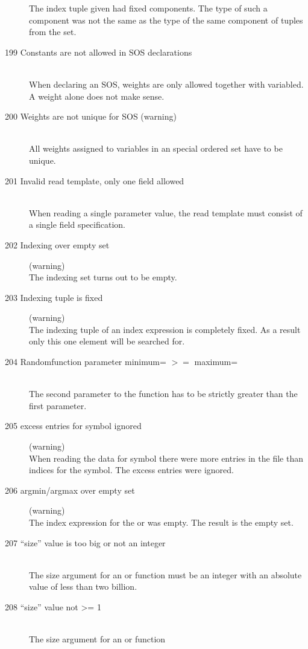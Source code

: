 \begin{description}
  The index tuple given had fixed components. The type of such a
  component was not the same as the type of the same component of tuples
  from the set.
\item[199 Constants are not allowed in SOS declarations]\ \\
  When declaring an SOS, weights are only allowed together with
  variabled. A weight alone does not make sense.
\item[200 Weights are not unique for SOS \code{xxx} (warning)]\ \\
  All weights assigned to variables in an special ordered set have to
  be unique. 
\item[201 Invalid read template, only one field allowed]\ \\
  When reading a single parameter value, the read template must
  consist of a single field specification.
\item[202 Indexing over empty set] (warning)\ \\
  The indexing set turns out to be empty.
\item[203 Indexing tuple is fixed] (warning)\ \\
  The indexing tuple of an index expression is completely fixed. As a
  result only this one element will be searched for.
\item[204 Randomfunction parameter minimum= \code{xxx} $>=$ maximum=
  \code{yyy}]\ \\
  The second parameter to the function  has to be
  strictly greater than the first parameter.
\item[205 \code{xxx} excess entries for symbol \code{yyy} ignored ]
  (warning)\ \\
  When reading the data for symbol  there were 
   more entries in the file than indices for the symbol.
  The excess entries were ignored.  
\item[206 argmin/argmax over empty set] (warning)\ \\
   The index expression for the  or  was
   empty. The result is the empty set.
\item[207 ``size'' value \code{xxx} is too big or not an integer]\ \\
   The size argument for an  or  function
   must be an integer with an absolute value of less than two billion.
\item[208 ``size'' value \code{xxx} not >= 1]\ \\
   The size argument for an  or  function

\end{description}
